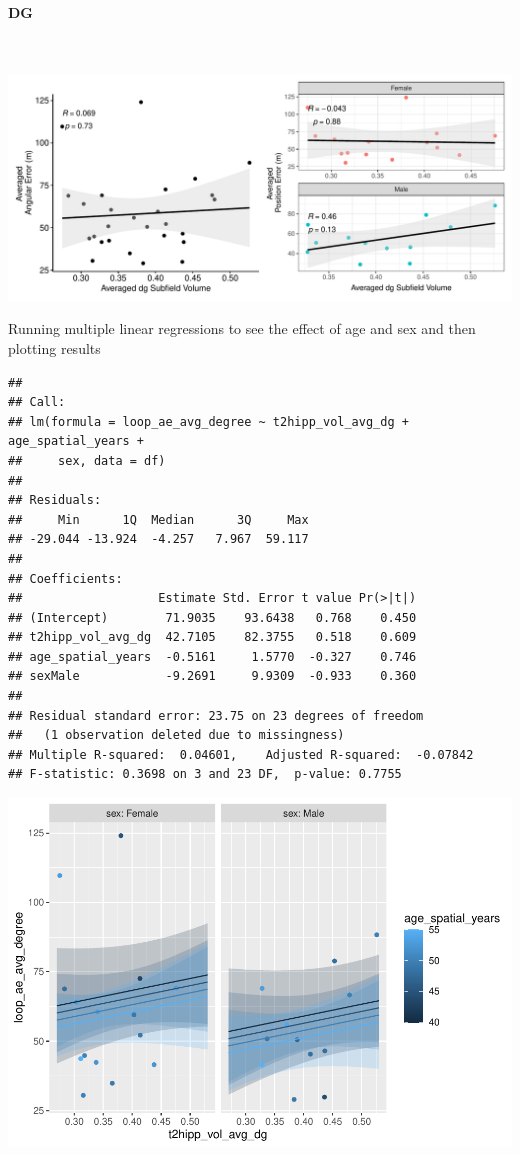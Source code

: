 \documentclass[
]{article}
\begin{document}
\paragraph{DG}

~ \vspace{1cm}

\includegraphics{hippocampal_subfield_files/figure-latex/unnamed-chunk-3-1.pdf}

\vspace{1cm}

Running multiple linear regressions to see the effect of age and sex and
then plotting results

\begin{verbatim}
## 
## Call:
## lm(formula = loop_ae_avg_degree ~ t2hipp_vol_avg_dg + age_spatial_years + 
##     sex, data = df)
## 
## Residuals:
##     Min      1Q  Median      3Q     Max 
## -29.044 -13.924  -4.257   7.967  59.117 
## 
## Coefficients:
##                   Estimate Std. Error t value Pr(>|t|)
## (Intercept)        71.9035    93.6438   0.768    0.450
## t2hipp_vol_avg_dg  42.7105    82.3755   0.518    0.609
## age_spatial_years  -0.5161     1.5770  -0.327    0.746
## sexMale            -9.2691     9.9309  -0.933    0.360
## 
## Residual standard error: 23.75 on 23 degrees of freedom
##   (1 observation deleted due to missingness)
## Multiple R-squared:  0.04601,    Adjusted R-squared:  -0.07842 
## F-statistic: 0.3698 on 3 and 23 DF,  p-value: 0.7755
\end{verbatim}

\includegraphics{hippocampal_subfield_files/figure-latex/Avg DG + avg angular error MLR-1.pdf}
\end{document}
